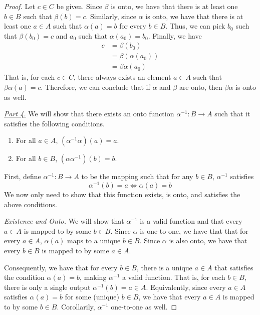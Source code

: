 \begin{hwproblem}
\begin{proof}
    Let \(c \in C\) be given. Since \(\beta\) is onto, we have that there is at least one \(b \in B\) such that \(\beta(b) = c\). Similarly, since \(\alpha\) is onto, we have that there is at least one \(a \in A\) such that \(\alpha(a) = b\) for every \(b \in B\). 
    Thus, we can pick \(b_0\) such that \(\beta(b_0) = c\) and \(a_0\) such that \(\alpha(a_0) = b_0\). Finally, we have
    \[
    \begin{aligned}
        c &= \beta(b_0) \\
          &= \beta(\alpha(a_0)) \\
          &= \beta\alpha(a_0)
    \end{aligned}
    \]
    That is, for each \(c \in C\), there always exists an element \(a \in A\) such that \(\beta\alpha(a) = c\). Therefore, we can conclude that if \(\alpha\) and \(\beta\) are onto, then \(\beta\alpha\) is onto as well.

    \underline{\textit{Part 4.}} We will show that there exists an onto function \(\alpha^{-1}: B \to A\) such that it satisfies the following conditions.
    \begin{enumerate}
        \item For all \(a \in A\), \((\alpha^{-1}\alpha)(a) = a\).
        \item For all \(b \in B\), \((\alpha\alpha^{-1})(b) = b\).
    \end{enumerate}

    First, define \(\alpha^{-1}: B \to A\) to be the mapping such that for any \(b \in B\), \(\alpha^{-1}\) satisfies
    \[
        \alpha^{-1}(b) = a \iff \alpha(a) = b
    \]
    We now only need to show that this function exists, is onto, and satisfies the above conditions.

    \textit{Existence and Onto.} We will show that \(\alpha^{-1}\) is a valid function and that every \(a \in A\) is mapped to by some \(b \in B\). Since \(\alpha\) is one-to-one, we have that that for every \(a \in A\), \(\alpha(a)\) maps to a unique \(b \in B\). Since \(\alpha\) is also onto, we have that every \(b \in B\) is mapped to by some \(a \in A\).

    Consequently, we have that for every \(b \in B\), there is a unique \(a \in A\) that satisfies the condition \(\alpha(a) = b\), making \(\alpha^{-1}\) a valid function. That is, for each \(b \in B\), there is only a single output \(\alpha^{-1}(b) = a \in A\). Equivalently, since every \(a \in A\) satisfies \(\alpha(a) = b\) for some (unique) \(b \in B\), we have that every \(a \in A\) is mapped to by some \(b \in B\). Corollarily, \(\alpha^{-1}\) one-to-one as well.
    

\end{proof}
\end{hwproblem}
